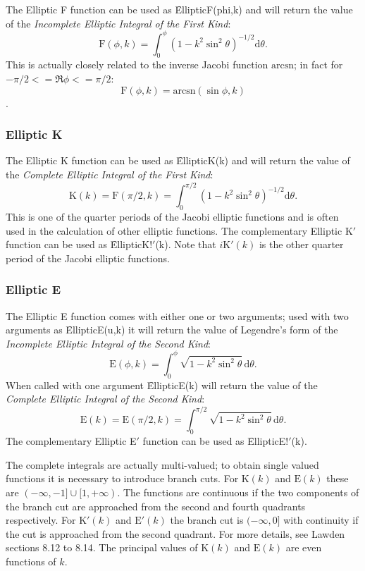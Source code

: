 The Elliptic F function can be used as \f{EllipticF(phi,k)} and
will return the value of the \emph{Incomplete Elliptic Integral of the
First Kind}:
\[\mathrm{F}(\phi, k)=\int_0^\phi(1-k^2 \sin^2 \theta)^{-1/2} \mathrm{d}\theta.\]
This is actually closely related to the inverse Jacobi function
$\mathrm{arcsn}$; in fact for $-\pi/2 <= \Re \phi <=\pi/2$:
\[ \mathrm{F}(\phi, k) = \mathrm{arcsn}(\sin \phi, k) \].
  
\subsubsection{Elliptic K}
\hypertarget{operator:ELLIPTICK}{}
\hypertarget{operator:ELLIPTICK'}{}

The Elliptic K function can be used as \f{EllipticK(k)} and will
return the value of the \emph{Complete Elliptic Integral of the
First Kind}:
\[\mathrm{K}(k)=\mathrm{F}(\pi/2, k) =\int_0^{\pi/2}(1-k^2 \sin^2 \theta)^{-1/2}\mathrm{d}\theta.\]
This is one of the quarter periods of the Jacobi elliptic
functions and is often used in the calculation of other elliptic functions.
The complementary Elliptic K$'$ function can be used as \f{EllipticK!$'$(k)}.
Note that $i\mathrm{K}'(k)$ is the other quarter period of the Jacobi
elliptic functions.  

\subsubsection{Elliptic E}
\hypertarget{operator:ELLIPTICE}{}
\hypertarget{operator:ELLIPTICE'}{}

The Elliptic E function comes with either one or two arguments;
used with two arguments as \f{EllipticE(u,k)}
it will return the value of Legendre's form of
the \emph{Incomplete Elliptic Integral of the Second Kind}:
\[\mathrm{E}(\phi, k)=\int_0^\phi \sqrt{1-k^2 \sin^2 \theta} \,\mathrm{d}\theta.\]
 When called with one argument \f{EllipticE(k)} will return the value of the
\emph{Complete Elliptic Integral of the Second Kind}:
\[\mathrm{E}(k)=\mathrm{E}(\pi/2, k) =
\int_0^{\pi/2} \sqrt{1-k^2 \sin^2 \theta} \,\mathrm{d}\theta.\]
The complementary Elliptic E$'$ function can be used as \f{EllipticE!$'$(k)}.

The complete integrals are actually multi-valued; to obtain single valued
functions it is necessary to introduce branch cuts. For $\mathrm{K}(k)$ and
$\mathrm{E}(k)$  these are $(-\infty, -1] \cup [1, +\infty)$.
The functions are continuous if the two components of the branch cut are
approached from the second and fourth quadrants respectively.
For $\mathrm{K}'(k)$ and $\mathrm{E}'(k)$ the branch cut is
$(-\infty, 0]$ with continuity if the cut is approached from the second
quadrant. For more details, see Lawden \cite{Lawden:89} sections 8.12 to 8.14.
The principal values of $\mathrm{K}(k)$ and $\mathrm{E}(k)$ are even functions
of $k$.

